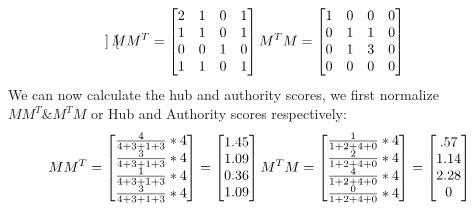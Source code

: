 \documentclass{article}
\begin{document}
\begin{enumerate}[label=(\alph*)]
\begin{equation*}
\begin{bmatrix}
        \end{bmatrix}
        MM^T =
        \begin{bmatrix}
        2   & 1 & 0     & 1 \\
        1   & 1 & 0     & 1 \\
        0   & 0 & 1     & 0 \\
        1   & 1 & 0     & 1
        \end{bmatrix}
        M^TM =
        \begin{bmatrix}
        1   & 0 & 0     & 0 \\
        0   & 1 & 1     & 0 \\
        0   & 1 & 3     & 0 \\
        0   & 0 & 0     & 0
        \end{bmatrix}
        \centering
    \end{equation*}
    We can now calculate the hub and authority scores, we first normalize $MM^T \& M^TM$ or Hub and Authority scores respectively:
    \begin{equation*}
        MM^T =
        \begin{bmatrix}
        \frac{4}{4 + 3 + 1 + 3} * 4 \\
        \frac{3}{4 + 3 + 1 + 3} * 4 \\
        \frac{1}{4 + 3 + 1 + 3} * 4 \\
        \frac{3}{4 + 3 + 1 + 3} * 4
        \end{bmatrix} =
        \begin{bmatrix}
        1.45 \\
        1.09 \\
        0.36 \\
        1.09
        \end{bmatrix}
        M^TM =
        \begin{bmatrix}
        \frac{1}{1 + 2 + 4 + 0} * 4 \\
        \frac{2}{1 + 2 + 4 + 0} * 4 \\
        \frac{4}{1 + 2 + 4 + 0} * 4 \\
        \frac{0}{1 + 2 + 4 + 0} * 4
        \end{bmatrix} =
        \begin{bmatrix}
            .57 \\
            1.14 \\
            2.28 \\
            0
        \end{bmatrix}
        \centering
    \end{equation*}

\end{enumerate}
\end{document}
